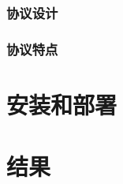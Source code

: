 \documentclass[15pt]{ctexart}
\begin{document}
		\subsubsection{协议设计} %
		\label{ssub:协议设计}
			
		\subsubsection{协议特点} %
		\label{ssub:协议特点}
			
	


\section{安装和部署} %
\label{sec:安装和部署}


\section{结果} %
\label{sec:结果}
\end{document}
